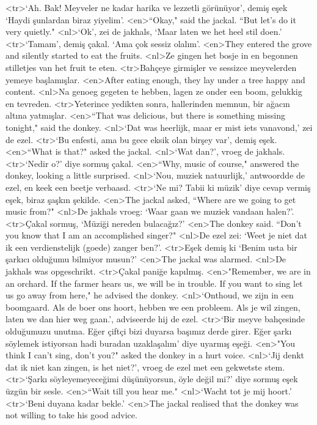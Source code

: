<tr>`Ah. Bak! Meyveler ne kadar harika ve lezzetli görünüyor', demiş eşek `Haydi şunlardan biraz yiyelim'.
<en>“Okay," said the jackal. “But let’s do it very quietly." 
<nl>`Ok', zei de jakhals, `Maar laten we het heel stil doen.'
<tr>`Tamam', demiş çakal. `Ama çok sessiz olalım'. 
<en>They entered the grove and silently started to eat the fruits. 
<nl>Ze gingen het bosje in en begonnen stilletjes van het fruit te eten.
<tr>Bahçeye girmişler ve sessizce meyvelerden yemeye başlamışlar.
<en>After eating enough, they lay under a tree happy and content. 
<nl>Na genoeg  gegeten te hebben, lagen ze onder een boom, gelukkig en tevreden.
<tr>Yeterince yedikten sonra, hallerinden memnun, bir ağacın altına yatmışlar.
<en>“That was delicious, but there is something missing tonight," said the donkey. 
<nl>`Dat was heerlijk, maar er mist iets vanavond,' zei de ezel.
<tr>`Bu enfesti, ama bu gece eksik olan birşey var', demiş eşek.
<en>“What is that?" asked the jackal. 
<nl>`Wat dan?', vroeg de jakhals.
<tr>`Nedir o?' diye sormuş çakal.
<en>“Why, music of course," answered the donkey, looking a little surprised. 
<nl>`Nou, muziek natuurlijk,' antwoordde de ezel, en keek een beetje verbaasd.
<tr>`Ne mi? Tabii ki müzik' diye cevap vermiş eşek, biraz şaşkın şekilde.
<en>The jackal asked, “Where are we going to get music from?" 
<nl>De jakhals vroeg: `Waar gaan we muziek vandaan halen?'.
<tr>Çakal sormuş, `Müziği nereden bulacağız?' 
<en>The donkey said. “Don’t you know that I am an accomplished singer?" 
<nl>De ezel zei: `Weet je niet dat ik een verdienstelijk (goede) zanger ben?'.
<tr>Eşek demiş ki `Benim usta bir şarkıcı olduğumu bilmiyor musun?'
<en>The jackal was alarmed. 
<nl>De jakhals was opgeschrikt.
<tr>Çakal paniğe kapılmış.
<en>"Remember, we are in an orchard. If the farmer hears us, we will be in trouble. If you want to sing let us go away from here," he advised the donkey. 
<nl>`Onthoud, we zijn in een boomgaard. Als de boer ons hoort, hebben  we een  probleem. Als je wil zingen, laten we  dan hier weg gaan.', adviseerde hij de ezel.
<tr>`Bir meyve bahçesinde olduğumuzu unutma. Eğer çiftçi bizi duyarsa başımız derde girer. Eğer şarkı söylemek istiyorsan hadi buradan uzaklaşalım' diye uyarmış eşeği.
<en>"You think I can't sing, don't you?" asked the donkey in a hurt voice. 
<nl>`Jij denkt dat ik niet kan zingen, is het niet?', vroeg de ezel met een gekwetste stem.
<tr>`Şarkı söyleyemeyeceğimi düşünüyorsun, öyle değil mi?' diye sormuş eşek üzgün bir sesle.
<en>“Wait till you hear me." 
<nl>`Wacht tot je mij hoort.'
<tr>`Beni duyana kadar bekle.'
<en>The jackal realised that the donkey was not willing to take his good advice. 
